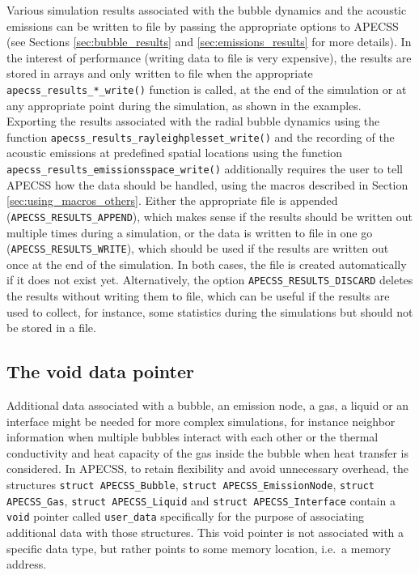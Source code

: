 Various simulation results associated with the bubble dynamics and the acoustic emissions can be written to file by passing the appropriate options to APECSS (see Sections \ref{sec:bubble_results} and \ref{sec:emissions_results} for more details). In the interest of performance (writing data to file is very expensive), the results are stored in arrays and only written to file when the appropriate {\tt apecss\_results\_*\_write()} function is called, at the end of the simulation or at any appropriate point during the simulation, as shown in the examples. Exporting the results associated with the radial bubble dynamics using the function {\tt apecss\_results\_rayleighplesset\_write()} and the recording of the acoustic emissions at predefined spatial locations using the function {\tt apecss\_results\_emissionsspace\_write()} additionally requires the user to tell APECSS how the data should be handled, using the macros described in Section \ref{sec:using_macros_others}. Either the appropriate file is appended ({\tt APECSS\_RESULTS\_APPEND}), which makes sense if the results should be written out multiple times during a simulation, or the data is written to file in one go ({\tt APECSS\_RESULTS\_WRITE}), which should be used if the results are written out once at the end of the simulation. In both cases, the file is created automatically if it does not exist yet. Alternatively, the option {\tt APECSS\_RESULTS\_DISCARD} deletes the results without writing them to file, which can be useful if the results are used to collect, for instance, some statistics during the simulations but should not be stored in a file.

\subsection{The void data pointer}

Additional data associated with a bubble, an emission node, a gas, a liquid or an interface might be needed for more complex simulations, for instance neighbor information when multiple bubbles interact with each other or the thermal conductivity and heat capacity of the gas inside the bubble when heat transfer is considered. In APECSS, to retain flexibility and avoid unnecessary overhead, the structures {\tt struct APECSS\_Bubble}, {\tt struct APECSS\_EmissionNode}, {\tt struct APECSS\_Gas}, {\tt struct APECSS\_Liquid} and {\tt struct APECSS\_Interface} contain a \texttt{void} pointer called \texttt{user\_data} specifically for the purpose of associating additional data with those structures. This void pointer is not associated with a specific data type, but rather points to some memory location, i.e.~a memory address. 

